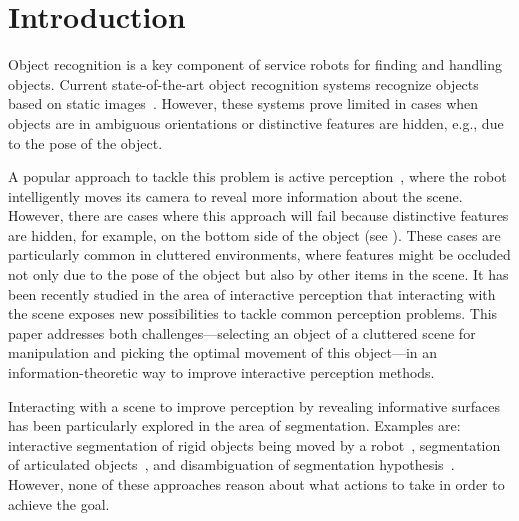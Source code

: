 
\section{Introduction}
    \vspace{-0.5ex}


Object recognition is a key component of service robots for finding and handling objects.
Current state-of-the-art object recognition systems recognize objects based on static images~\cite{tang2012textured,van2013fusing}.
However, these systems prove limited in cases when objects are in ambiguous orientations or distinctive features are hidden, e.g., due to the pose of the object.
 

A popular approach to tackle this problem is active perception~\cite{atanasov2013hypothesis,hollinger2011active}, where the robot intelligently moves its camera to reveal more information about the scene.
However, there are cases where this approach will fail because distinctive features are hidden, for example, on the bottom side of the object (see ).
These cases are particularly common in cluttered environments, where features might be occluded not only due to the pose of the object but also by other items in the scene. 
It has been recently studied in the area of interactive perception that interacting with the scene exposes new possibilities to tackle common perception problems.
This paper addresses both challenges---selecting an object of a cluttered scene for manipulation and picking the optimal movement of this object---in an information-theoretic way to improve interactive perception methods.

Interacting with a scene to improve perception by revealing informative surfaces has been particularly explored in the area of segmentation.
Examples are: interactive segmentation of rigid objects being moved by a robot~\cite{KenneyInteractive}, segmentation of articulated objects~\cite{Katz-WS-MM-ICRA2011}, and disambiguation of segmentation hypothesis~\cite{bergstrom11icvs}.
However, none of these approaches reason about what actions to take in order to achieve the goal.

